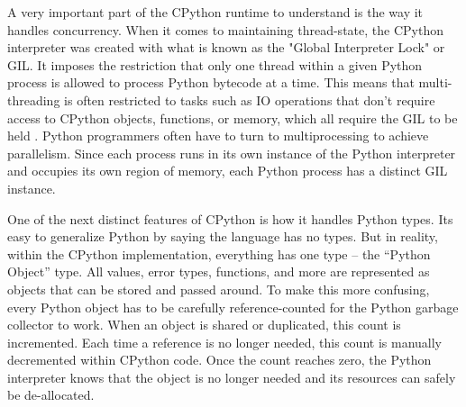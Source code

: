 \quad A very important part of the CPython runtime to understand is the way it handles concurrency. When it comes to maintaining thread-state, the CPython interpreter was created with what is known as the "Global Interpreter Lock" or GIL. It imposes the restriction that only one thread within a given Python process is allowed to process Python bytecode at a time. This means that multi-threading is often restricted to tasks such as IO operations that don't require access to CPython objects, functions, or memory, which all require the GIL to be held \cite{cpythonthreads}. Python programmers often have to turn to multiprocessing to achieve parallelism. Since each process runs in its own instance of the Python interpreter and occupies its own region of memory, each Python process has a distinct GIL instance.

\quad One of the next distinct features of CPython is how it handles Python types. Its easy to generalize Python by saying the language has no types. But in reality, within the CPython implementation, everything has one type -- the ``Python Object'' type. All values, error types, functions, and more are represented as objects that can be stored and passed around. To make this more confusing, every Python object has to be carefully reference-counted for the Python garbage collector to work. When an object is shared or duplicated, this count is incremented. Each time a reference is no longer needed, this count is manually decremented within CPython code. Once the count reaches zero, the Python interpreter knows that the object is no longer needed and its resources can safely be de-allocated. 